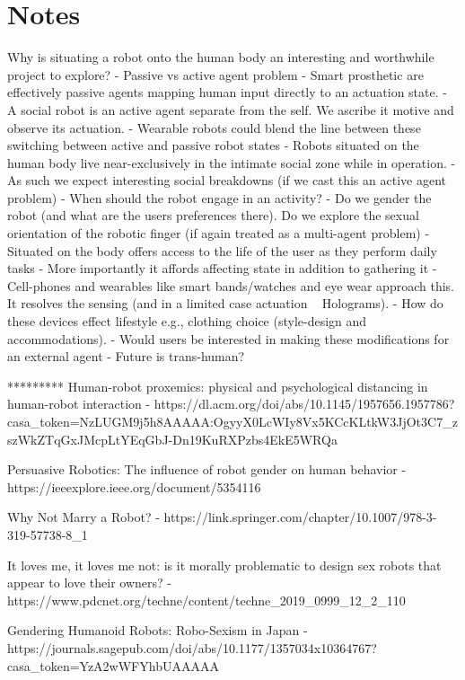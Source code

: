 \section{Notes}

Why is situating a robot onto the human body an interesting and worthwhile project to explore?
- Passive vs active agent problem
    - Smart prosthetic are effectively passive agents mapping human input directly to an actuation state.
    - A social robot is an active agent separate from the self. We ascribe it motive and observe its actuation. 
    - Wearable robots could blend the line between these switching between active and passive robot states
- Robots situated on the human body live near-exclusively in the intimate social zone while in operation.
    - As such we expect interesting social breakdowns (if we cast this an active agent problem)
        - When should the robot engage in an activity? 
    - Do we gender the robot (and what are the users preferences there). Do we explore the sexual orientation of the robotic finger (if again treated as a multi-agent problem)
- Situated on the body offers access to the life of the user as they perform daily tasks
    - More importantly it affords affecting state in addition to gathering it
    - Cell-phones and wearables like smart bands/watches and eye wear approach this. It resolves the sensing (and in a limited case actuation ~ Holograms).
- How do these devices effect lifestyle e.g., clothing choice (style-design and accommodations). 
    - Would users be interested in making these modifications for an external agent
- Future is trans-human?

********* Human-robot proxemics: physical and psychological distancing in human-robot interaction - https://dl.acm.org/doi/abs/10.1145/1957656.1957786?casa_token=NzLUGM9j5h8AAAAA:OgyyX0LcWIy8Vx5KCcKLtkW3JjOt3C7_zszWkZTqGxJMcpLtYEqGbJ-Dn19KuRXPzbs4EkE5WRQa


Persuasive Robotics: The influence of robot gender on human behavior - https://ieeexplore.ieee.org/document/5354116

Why Not Marry a Robot? - https://link.springer.com/chapter/10.1007/978-3-319-57738-8_1

It loves me, it loves me not: is it morally problematic to design sex robots that appear to love their owners? - https://www.pdcnet.org/techne/content/techne_2019_0999_12_2_110

Gendering Humanoid Robots: Robo-Sexism in Japan - https://journals.sagepub.com/doi/abs/10.1177/1357034x10364767?casa_token=YzA2wWFYhbUAAAAA%

